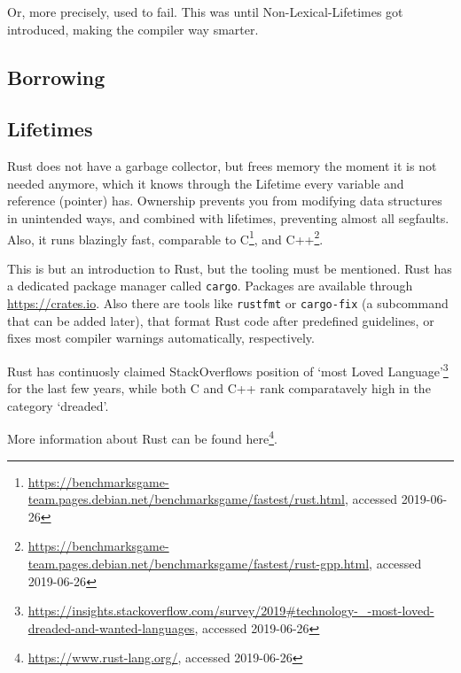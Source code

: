 Or, more precisely, used to fail. This was until Non-Lexical-Lifetimes got
introduced, making the compiler way smarter.


\subsection{Borrowing}


\subsection{Lifetimes}



Rust does not have a garbage collector, but frees memory the moment it is not
needed anymore, which it knows through the Lifetime every variable and
reference (pointer) has. Ownership prevents you from modifying data structures
in unintended ways, and combined with lifetimes, preventing almost all
segfaults. Also, it runs blazingly fast, comparable to
C\footnote{\url{https://benchmarksgame-team.pages.debian.net/benchmarksgame/fastest/rust.html},
accessed 2019-06-26}, and
C++\footnote{\url{https://benchmarksgame-team.pages.debian.net/benchmarksgame/fastest/rust-gpp.html},
accessed 2019-06-26}.


This is but an introduction to Rust, but the tooling must be mentioned. Rust
has a dedicated package manager called \verb|cargo|. Packages are available
through \url{https://crates.io}. Also there are tools like \verb|rustfmt| or
\verb|cargo-fix| (a subcommand that can be added later), that format Rust code
after predefined guidelines, or fixes most compiler warnings automatically,
respectively.

Rust has continuosly claimed StackOverflows position of `most Loved
Language'\footnote{\url{https://insights.stackoverflow.com/survey/2019\#technology-\_-most-loved-dreaded-and-wanted-languages}, accessed 2019-06-26}
for the last few years, while both C and C++ rank comparatavely high in the
category `dreaded'.

More information about Rust can be found here\footnote{\url{https://www.rust-lang.org/}, accessed 2019-06-26}.


